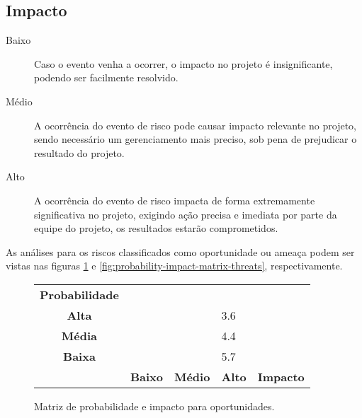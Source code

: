\subsection{Impacto}

\begin{description}
	\item [Baixo] Caso o evento venha a ocorrer, o impacto no projeto é insignificante, podendo ser facilmente resolvido.
	\item [Médio] A ocorrência do evento de risco pode causar impacto relevante no projeto, sendo necessário um gerenciamento mais preciso, sob pena de prejudicar o resultado do projeto.
	\item [Alto] A ocorrência do evento de risco impacta de forma extremamente significativa no projeto, exigindo ação precisa e imediata por parte da equipe do projeto, os resultados estarão comprometidos.
\end{description}

As análises para os riscos classificados como oportunidade ou ameaça podem ser vistas nas figuras \ref{fig:probability-impact-matrix-oportunity} e \ref{fig:probability-impact-matrix-threats}, respectivamente.

\begin{figure}[h]
	\begin{tabularx}{\textwidth}{ c | >{\centering\arraybackslash}X >{\centering\arraybackslash}X >{\centering\arraybackslash}X l}
		\textbf{Probabilidade} &                                     &                                       &                                  &                  \\
		\cellcolor{red!30!}\textbf{Alta} &
		\cellcolor{yellow!10!} &
		\cellcolor{red!10!} &
		\cellcolor{red!10!}3.6 &   \\
		\cellcolor{yellow!30!}\textbf{Média}&
		\cellcolor{green!10!} &
		\cellcolor{yellow!10!} &
		\cellcolor{red!10!} 4.4 &   \\
		\cellcolor{green!30!}\textbf{Baixa}&
		\cellcolor{green!10!} &
		\cellcolor{green!10!} &
		\cellcolor{yellow!10!} 5.7 &   \\
		\hline
		                       & \cellcolor{green!30!}\textbf{Baixo} & \cellcolor{yellow!30!}\textbf{Médio} & \cellcolor{red!30!}\textbf{Alto} & \textbf{Impacto} \\
	\end{tabularx}
	\caption{Matriz de probabilidade e impacto para oportunidades.}
	\label{fig:probability-impact-matrix-oportunity}
	\centering
\end{figure}

